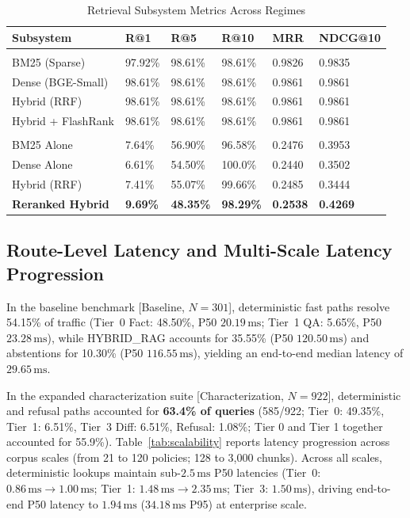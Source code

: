 \documentclass[journal]{IEEEtran}
\newcommand{\ms}{\,\mathrm{ms}}
\begin{document}
\begin{table}[!t]
\caption{Retrieval Subsystem Metrics Across Regimes}
\label{tab:retrieval}
\centering
\scriptsize
\setlength{\tabcolsep}{1.8pt}
\renewcommand{\arraystretch}{0.85}
\begin{tabularx}{\columnwidth}{>{\raggedright\arraybackslash}p{2.3cm}YYYYY}
\toprule
\textbf{Subsystem} & \textbf{R@1} & \textbf{R@5} & \textbf{R@10} & \textbf{MRR} & \textbf{NDCG@10}\\
\midrule
{}\\
BM25 (Sparse) & 97.92\% & 98.61\% & 98.61\% & 0.9826 & 0.9835\\
Dense (BGE-Small) & 98.61\% & 98.61\% & 98.61\% & 0.9861 & 0.9861\\
Hybrid (RRF) & 98.61\% & 98.61\% & 98.61\% & 0.9861 & 0.9861\\
Hybrid + FlashRank & 98.61\% & 98.61\% & 98.61\% & 0.9861 & 0.9861\\
\midrule
{}\\
BM25 Alone & 7.64\% & 56.90\% & 96.58\% & 0.2476 & 0.3953\\
Dense Alone & 6.61\% & 54.50\% & 100.0\% & 0.2440 & 0.3502\\
Hybrid (RRF) & 7.41\% & 55.07\% & 99.66\% & 0.2485 & 0.3444\\
\textbf{Reranked Hybrid} & \textbf{9.69\%} & \textbf{48.35\%} & \textbf{98.29\%} & \textbf{0.2538} & \textbf{0.4269}\\
\bottomrule
\end{tabularx}
\end{table}

\subsection{Route-Level Latency and Multi-Scale Latency Progression}
In the baseline benchmark [Baseline, $N=301$], deterministic fast paths resolve 54.15\% of traffic (Tier~0 Fact: 48.50\%, P50 $20.19\ms$; Tier~1 QA: 5.65\%, P50 $23.28\ms$), while HYBRID\_RAG accounts for 35.55\% (P50 $120.50\ms$) and abstentions for 10.30\% (P50 $116.55\ms$), yielding an end-to-end median latency of $29.65\ms$.

In the expanded characterization suite [Characterization, $N=922$], deterministic and refusal paths accounted for \textbf{63.4\% of queries} (585/922; Tier~0: 49.35\%, Tier~1: 6.51\%, Tier~3 Diff: 6.51\%, Refusal: 1.08\%; Tier 0 and Tier 1 together accounted for 55.9\%). Table~\ref{tab:scalability} reports latency progression across corpus scales (from 21 to 120 policies; 128 to 3,000 chunks). Across all scales, deterministic lookups maintain sub-$2.5\ms$ P50 latencies (Tier~0: $0.86\ms \to 1.00\ms$; Tier~1: $1.48\ms \to 2.35\ms$; Tier~3: $1.50\ms$), driving end-to-end P50 latency to $1.94\ms$ ($34.18\ms$ P95) at enterprise scale.
\end{document}
